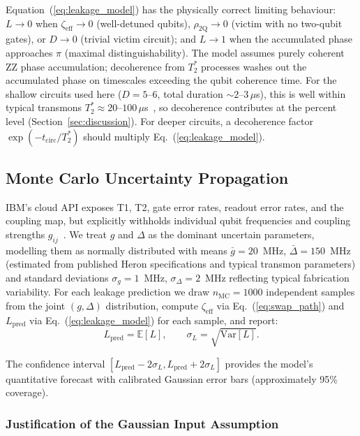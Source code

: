 \documentclass[ASNA,twocolumn]{USG}
\begin{document}
Equation~(\ref{eq:leakage_model}) has the physically correct limiting behaviour: $L \to 0$ when $\zeta_{\mathrm{eff}} \to 0$ (well-detuned qubits), $\rho_{\mathrm{2Q}} \to 0$ (victim with no two-qubit gates), or $D \to 0$ (trivial victim circuit); and $L \to 1$ when the accumulated phase approaches $\pi$ (maximal distinguishability). The model assumes purely coherent ZZ phase accumulation; decoherence from $T_2^*$ processes washes out the accumulated phase on timescales exceeding the qubit coherence time. For the shallow circuits used here ($D=5$--$6$, total duration $\sim 2$--$3$\,$\mu$s), this is well within typical transmons $T_2^* \approx 20$--$100$\,$\mu$s~\cite{burnett2019decoherence}, so decoherence contributes at the percent level (Section~\ref{sec:discussion}). For deeper circuits, a decoherence factor $\exp(-t_{\mathrm{circ}}/T_2^*)$ should multiply Eq.~(\ref{eq:leakage_model}).

\subsection{Monte Carlo Uncertainty Propagation}

IBM's cloud API exposes T1, T2, gate error rates, readout error rates, and the coupling map, but explicitly withholds individual qubit frequencies and coupling strengths $g_{ij}$~\cite{ibmq2026}. We treat $g$ and $\Delta$ as the dominant uncertain parameters, modelling them as normally distributed with means $\bar{g} = 20$~MHz, $\bar{\Delta} = 150$~MHz (estimated from published Heron specifications and typical transmon parameters) and standard deviations $\sigma_g = 1$~MHz, $\sigma_\Delta = 2$~MHz reflecting typical fabrication variability. For each leakage prediction we draw $n_{\mathrm{MC}} = 1000$ independent samples from the joint $(g, \Delta)$ distribution, compute $\zeta_{\mathrm{eff}}$ via Eq.~(\ref{eq:swap_path}) and $L_{\mathrm{pred}}$ via Eq.~(\ref{eq:leakage_model}) for each sample, and report:
\begin{equation}
    L_{\mathrm{pred}} = \mathbb{E}[L], \qquad \sigma_L = \sqrt{\mathrm{Var}[L]}.
\label{eq:uncertainty}
\end{equation}

The confidence interval $[L_{\mathrm{pred}} - 2\sigma_L, L_{\mathrm{pred}} + 2\sigma_L]$ provides the model's quantitative forecast with calibrated Gaussian error bars (approximately 95\% coverage).

\subsubsection*{Justification of the Gaussian Input Assumption}
\end{document}

